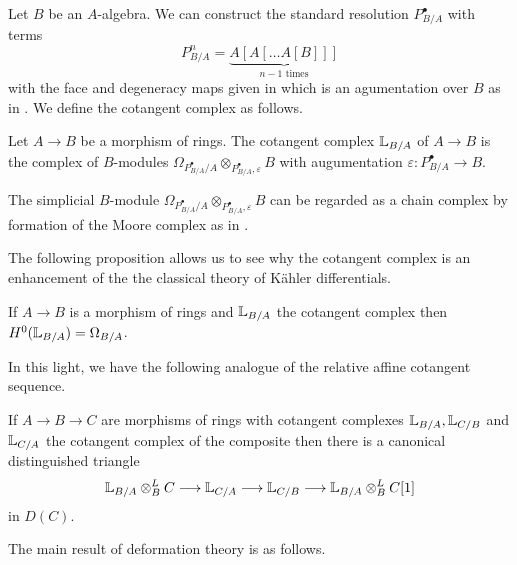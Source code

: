 Let $B$ be an $A$-algebra. We can construct the standard resolution $P_{B/A}^{\bullet}$ with terms 
$$P^{n}_{B/A}=\underbrace{A\left[A[\dots A[B]]\right]}_{n-1\text{ times}}$$
with the face and degeneracy maps given in \cite[\href{https://stacks.math.columbia.edu/tag/09CB}{Tag 09CB}]{stacks-project} which is an agumentation over $B$ as in \cite[\href{https://stacks.math.columbia.edu/tag/018G}{Tag 018G}]{stacks-project}. We define the cotangent complex as follows. 
\begin{definition}\label{def: cotangent complex}
    Let $A\to B$ be a morphism of rings. The cotangent complex $\mathbb{L}_{B/A}$ of $A\to B$ is the complex of $B$-modules $\Omega_{P^{\bullet}_{B/A}/A}\otimes_{P^{\bullet}_{B/A},\varepsilon}B$ with augumentation $\varepsilon:P_{B/A}^{\bullet}\to B$. 
\end{definition}
\begin{remark}
    The simplicial $B$-module $\Omega_{P^{\bullet}_{B/A}/A}\otimes_{P^{\bullet}_{B/A},\varepsilon}B$ can be regarded as a chain complex by formation of the Moore complex as in \cite[\href{https://stacks.math.columbia.edu/tag/0194}{Tag 0194}]{stacks-project}.
\end{remark}
The following proposition allows us to see why the cotangent complex is an enhancement of the the classical theory of K\"{a}hler differentials. 
\begin{proposition}\label{prop: cotangent complex enhances Kahler differentials}
    If $A\to B$ is a morphism of rings and $\mathbb{L}_{B/A}$ the cotangent complex then $H^{0}(\mathbb{L}_{B/A})=\Omega_{B/A}$. 
\end{proposition}
In this light, we have the following analogue of the relative affine cotangent sequence.  
\begin{proposition}
    If $A\to B\to C$ are morphisms of rings with cotangent complexes $\mathbb{L}_{B/A},\mathbb{L}_{C/B}$ and $\mathbb{L}_{C/A}$ the cotangent complex of the composite then there is a canonical distinguished triangle
    $$\mathbb{L}_{B/A}\otimes^{L}_{B}C\longrightarrow \mathbb{L}_{C/A}\longrightarrow\mathbb{L}_{C/B}\longrightarrow\mathbb{L}_{B/A}\otimes_{B}^{L}C[1]$$
    in $D(C)$. 
\end{proposition}
The main result of deformation theory is as follows. 
